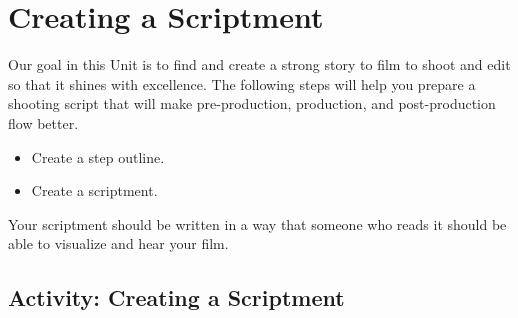 \documentclass[
]{book}
\providecommand{\tightlist}{%
  \setlength{\itemsep}{0pt}\setlength{\parskip}{0pt}}
\begin{document}
\hypertarget{creating-a-scriptment}{%
\section{Creating a Scriptment}\label{creating-a-scriptment}}

Our goal in this Unit is to find and create a strong story to film to shoot and edit so that it shines with excellence. The following steps will help you prepare a shooting script that will make pre-production, production, and post-production flow better.

\begin{itemize}
\tightlist
\item
  Create a step outline.\\
\item
  Create a scriptment.
\end{itemize}

Your scriptment should be written in a way that someone who reads it should be able to visualize and hear your film.

\hypertarget{activity-creating-a-scriptment}{%
\subsection*{Activity: Creating a Scriptment}\label{activity-creating-a-scriptment}}
\end{document}
